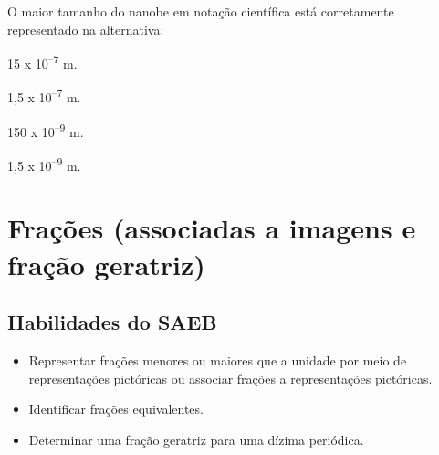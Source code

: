O maior tamanho do nanobe em notação científica está corretamente
representado na alternativa:

\begin{escolha}
\item 15 x 10\textsuperscript{--7} m.
\item 1,5 x 10\textsuperscript{--7} m.
\item 150 x 10\textsuperscript{--9} m.
\item 1,5 x 10\textsuperscript{--9} m.
\end{escolha}

\chapter{Frações (associadas a imagens e fração geratriz)}

\section{Habilidades do SAEB}

\begin{itemize}
  \item Representar frações menores ou maiores que a unidade por meio de
representações pictóricas ou associar frações a representações pictóricas.
  \item Identificar frações equivalentes.
  \item Determinar uma fração geratriz para uma dízima periódica.   
\end{itemize} 

